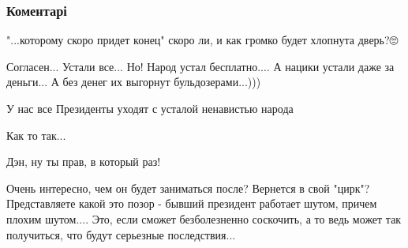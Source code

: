  
 
 
 
 
\subsubsection{Коментарі}
\label{sec:09_05_2021.fb.zharkih_denis.1.den_pobedy.cmt}

\begin{itemize}
 
"...которому скоро придет конец" скоро ли, и как громко будет хлопнута дверь?🙄

 
Согласен... Устали все... Но! Народ устал бесплатно.... А нацики устали даже за деньги... А без денег их выгорнут бульдозерами...)))

 
У нас все Президенты уходят с усталой ненавистью народа

 
Как то так...


Дэн, ну ты прав, в который раз!

 
Очень интересно, чем он будет заниматься после? Вернется в свой "цирк"?
Представляете какой это позор - бывший президент работает шутом, причем плохим
шутом.... Это, если сможет безболезненно соскочить, а то ведь может так
получиться, что будут серьезные последствия...

\end{itemize}

